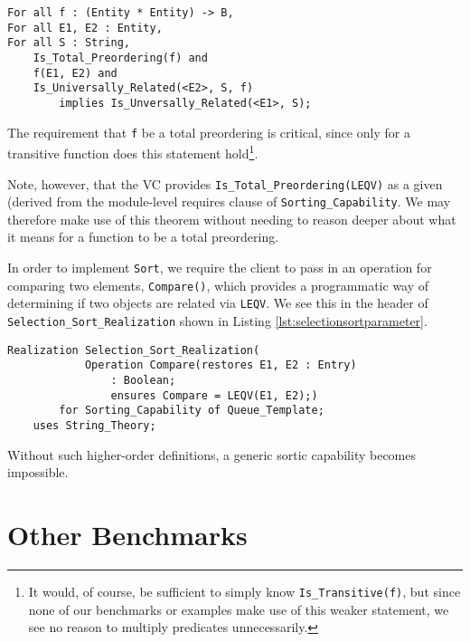 \begin{lstlisting}[float=h,language=resolve,caption={A Useful \texttt{Is\_Universally\_Related} theorem\label{lst:universallyrelatedtheorem}}]
For all f : (Entity * Entity) -> B,
For all E1, E2 : Entity,
For all S : String,
	Is_Total_Preordering(f) and
	f(E1, E2) and
	Is_Universally_Related(<E2>, S, f)
		implies Is_Unversally_Related(<E1>, S);
\end{lstlisting}

The requirement that \texttt{f} be a total preordering is critical, since only for a transitive function does this statement hold\footnote{It would, of course, be sufficient to simply know \texttt{Is\_Transitive(f)}, but since none of our benchmarks or examples make use of this weaker statement, we see no reason to multiply predicates unnecessarily.}.

Note, however, that the VC provides \texttt{Is\_Total\_Preordering(LEQV)} as a given (derived from the module-level requires clause of \texttt{Sorting\_Capability}.  We may therefore make use of this theorem without needing to reason deeper about what it means for a function to be a total preordering.

In order to implement \texttt{Sort}, we require the client to pass in an operation for comparing two elements, \texttt{Compare()}, which provides a programmatic way of determining if two objects are related via \texttt{LEQV}.  We see this in the header of \texttt{Selection\_Sort\_Realization} shown in Listing \ref{lst:selectionsortparameter}.

\begin{lstlisting}[float=h,language=resolve,caption={\texttt{Selection\_Sort\_Realization} taking an operation that implements \texttt{LEQV}\label{lst:selectionsortparameter}}]
Realization Selection_Sort_Realization(
			Operation Compare(restores E1, E2 : Entry) 
				: Boolean;
				ensures Compare = LEQV(E1, E2);)
		for Sorting_Capability of Queue_Template;
	uses String_Theory;
\end{lstlisting}

Without such higher-order definitions, a generic sortic capability becomes impossible.


\section{Other Benchmarks}

